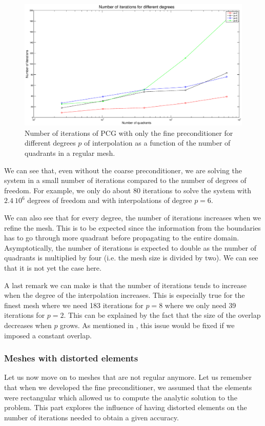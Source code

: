 \begin{figure}
\centering
\includegraphics[scale=0.35]{Results/fine_reg_iter.eps}
\caption{Number of iterations of PCG with only the fine preconditioner for different degrees $p$ of interpolation as a function of the number of quadrants in a regular mesh.}
\label{fine_reg_iter} 
\end{figure}

We can see that, even without the coarse preconditioner, we are solving the system in a small number of iterations compared to the number of degrees of freedom. For example, we only do about 80 iterations to solve the system with $2.4\: 10^{6}$ degrees of freedom and with interpolations of degree $p=6$. 

 We can also see that for every degree, the number of iterations increases when we refine the mesh. This is to be expected since the information from the boundaries has to go through more quadrant before propagating to the entire domain. Asymptotically, the number of iterations is expected to double as the number of quadrants is multiplied by four (i.e. the mesh size is divided by two). We can see that it is not yet the case here.

A last remark we can make is that the number of iterations tends to increase when the degree of the interpolation increases. This is especially true for the finest mesh where we need 183 iterations for $p=8$ where we only need 39 iterations for $p=2$. This can be explained by the fact that the size of the overlap decreases when $p$ grows. As mentioned in \cite{overlap_constant}, this issue would be fixed if we imposed a constant overlap.

\subsubsection{Meshes with distorted elements}
Let us now move on to meshes that are not regular anymore. Let us remember that when we developed the fine preconditioner, we assumed that the elements were rectangular which allowed us to compute the analytic solution to the problem. This part explores the influence of having distorted elements on the number of iterations needed to obtain a given accuracy. 

